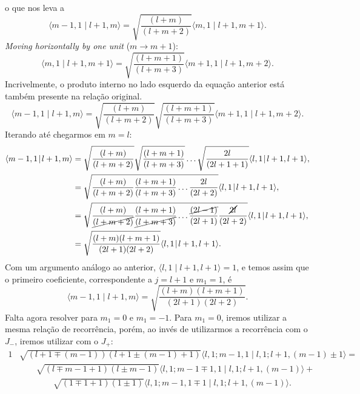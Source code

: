 \documentclass{article}
\newcommand{\braket}[2]{\langle #1 \!\mid\! #2 \rangle}
\begin{document}
o que nos leva a
\begin{equation}
 \braket{m - 1,1}{l + 1,m} = \sqrt{\frac{(l + m)}{(l + m + 2)}} \braket{m,1}{l + 1,m + 1} \mathrm{.}
\end{equation}
\textit{Moving horizontally by one unit} ($m \to m + 1$):
\begin{equation}
 \braket{m,1}{l + 1,m+1} = \sqrt{\frac{(l + m + 1)}{(l + m + 3)}} \braket{m+1,1}{l + 1,m + 2} \mathrm{.}
\end{equation}
Incrivelmente, o produto interno no lado esquerdo da equação anterior está também presente na relação original.
\begin{equation}
 \braket{m - 1,1}{l + 1,m} = \sqrt{\frac{(l + m)}{(l + m + 2)}} \sqrt{\frac{(l + m + 1)}{(l + m + 3)}} \braket{m+1,1}{l + 1,m + 2} \mathrm{.}
\end{equation}
Iterando até chegarmos em $m = l$:
\begin{alignat}{1}
 \nonumber
 \braket{m - 1,1}{l + 1,m} &= \sqrt{\frac{(l + m)}{(l + m + 2)}} \sqrt{\frac{(l + m + 1)}{(l + m + 3)}} \ldots \sqrt{\frac{2l}{(2l + 1 + 1)}}
 \braket{l,1}{l + 1,l + 1} \mathrm{,}\\ \nonumber
 &= \sqrt{\frac{(l + m)}{(l + m + 2)}\frac{(l + m + 1)}{(l + m + 3)} \ldots \frac{2l}{(2l + 2)}}
 \braket{l,1}{l + 1,l + 1} \mathrm{,}\\ \nonumber
 &= \sqrt{\frac{(l + m)}{\cancel{(l + m + 2)}}\frac{(l + m + 1)}{\cancel{(l + m + 3)}} \ldots \frac{\cancel{(2l-1)}}{(2l + 1)}\frac{\cancel{2l}}{(2l + 2)}}
 \braket{l,1}{l + 1,l + 1} \mathrm{,}\\
 &= \sqrt{\frac{(l + m)(l + m + 1)}{(2l + 1)(2l + 2)}}
 \braket{l,1}{l + 1,l + 1} \mathrm{.}
\end{alignat}
Com um argumento análogo ao anterior, $\braket{l,1}{l + 1,l + 1} = 1$, e temos assim que o primeiro coeficiente, correspondente a $j = l + 1$ e $m_1 = 1$, é
\begin{equation}
 \braket{m - 1,1}{l + 1,m} = \sqrt{\frac{(l + m)(l + m + 1)}{(2l + 1)(2l + 2)}} \mathrm{.}
\end{equation}
Falta agora resolver para $m_1 = 0$ e $m_1 = -1$. Para $m_1 = 0$, iremos utilizar a mesma relação de recorrência, porém, ao invés de utilizarmos a recorrência com
o $J_-$, iremos utilizar com o $J_+$:
\begin{alignat}{1}
\nonumber
 &\sqrt{(l + 1 \mp (m - 1))(l + 1 \pm (m - 1) + 1)} \braket{l, 1;m - 1,1}{l,1;l + 1,(m - 1)\pm1} = \\ \nonumber
 &\qquad \sqrt{(l \mp m - 1 + 1)(l \pm m - 1)} \braket{l, 1;m - 1\mp1,1}{l,1;l + 1,(m - 1)} + \\
 &\qquad \qquad \sqrt{(1 \mp 1 + 1)(1 \pm 1)} \braket{l, 1;m - 1,1\mp1}{l,1;l + 1,(m - 1)} \mathrm{.}
\end{alignat}
\end{document}
